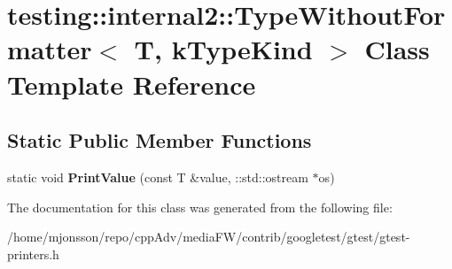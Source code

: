 \hypertarget{classtesting_1_1internal2_1_1TypeWithoutFormatter}{}\section{testing\+:\+:internal2\+:\+:Type\+Without\+Formatter$<$ T, k\+Type\+Kind $>$ Class Template Reference}
\label{classtesting_1_1internal2_1_1TypeWithoutFormatter}
\subsection*{Static Public Member Functions}
\begin{DoxyCompactItemize}
\item 
\mbox{\label{classtesting_1_1internal2_1_1TypeWithoutFormatter_a6651f6f7be2c0f899729eeb6038f76d3}} 
static void {\bfseries Print\+Value} (const T \&value, \+::std\+::ostream $\ast$os)
\end{DoxyCompactItemize}


The documentation for this class was generated from the following file\+:\begin{DoxyCompactItemize}
\item 
/home/mjonsson/repo/cpp\+Adv/media\+F\+W/contrib/googletest/gtest/gtest-\/printers.\+h\end{DoxyCompactItemize}
